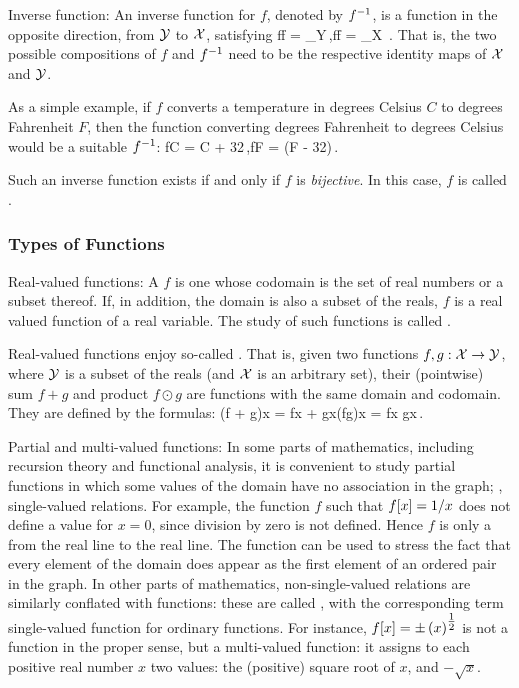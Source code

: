 Inverse function: An inverse function for $f$, denoted by ${f}^{-1}$, is a function in the opposite direction, from $\mathcal{Y}$ to $\mathcal{X}$, satisfying
\beq
f\fcomp\inv f = _{\set Y}\,,\qquad \inv f\fcomp f = _{\set X} \,.
\eeq
That is, the two possible compositions of $f$ and ${f}^{-1}$ need to be the respective identity maps of $\mathcal{X}$ and $\mathcal{Y}$. 

As a simple example, if $f$ converts a temperature in degrees Celsius $C$ to degrees Fahrenheit $F$, then the function converting degrees Fahrenheit to degrees Celsius would be a suitable ${f}^{-1}$:
\beq
f\vat C = C + 32\,,\qquad \inv f\vat F = (F - 32)\,.
\eeq

Such an inverse function exists if and only if $f$ is \emph{bijective}. In this case, $f$ is called . 


\subsubsection{Types of Functions}
Real-valued functions: A  $f$ is one whose codomain is the set of real numbers or a subset thereof. If, in addition, the domain is also a subset of the reals, $f$ is a real valued function of a real variable. The study of such functions is called .

Real-valued functions enjoy so-called . That is, given two functions ${f,g}:{\mathcal{X}}\to{\mathcal{Y}}$, where $\mathcal{Y}$ is a subset of the reals (and $\mathcal{X}$ is an arbitrary set), their (pointwise) sum $f+g$ and product $f\odot g$ are functions with the same domain and codomain. They are defined by the formulas:
\beq
(f + g)\vat x = f\vat x + g\vat x\qquad{}\qquad (fg)\vat x = f\vat x g\vat x\,.
\eeq

Partial and multi-valued functions: In some parts of mathematics, including recursion theory and functional analysis, it is convenient to study partial functions in which some values of the domain have no association in the graph; \ie, single-valued relations. For example, the function $f$ such that $f\!\left[{x}\right] = 1/x$ does not define a value for $x = 0$, since division by zero is not defined. Hence $f$ is only a  from the real line to the real line. The  function can be used to stress the fact that every element of the domain does appear as the first element of an ordered pair in the graph. In other parts of mathematics, non-single-valued relations are similarly conflated with functions: these are called , with the corresponding term single-valued function for ordinary functions. For instance, $f\!\left[{x}\right] = \pm\left({x}\right)^{\tfrac{1}{2}}$ is not a function in the proper sense, but a multi-valued function: it assigns to each positive real number $x$ two values: the (positive) square root of $x$, and $-\sqrt{x}$.

